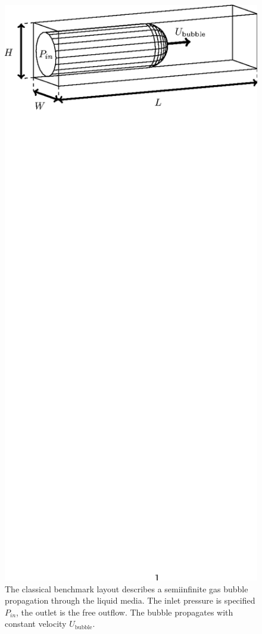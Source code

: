 \documentclass{article}
\begin{document}
\begin{figure}[htb!]
\includegraphics*[bb=153 610 410 717,width=\textwidth]{Figures/benchmark_classical.eps} 
\caption{The classical benchmark layout describes a semiinfinite gas bubble
propagation through the liquid media. The inlet pressure is specified $P_{in}$, the outlet is the
free outflow. The bubble propagates with constant velocity $U_{\mathrm{bubble}}$. 
\label{fig:classical:benchmark}}
\end{figure}
\end{document}
